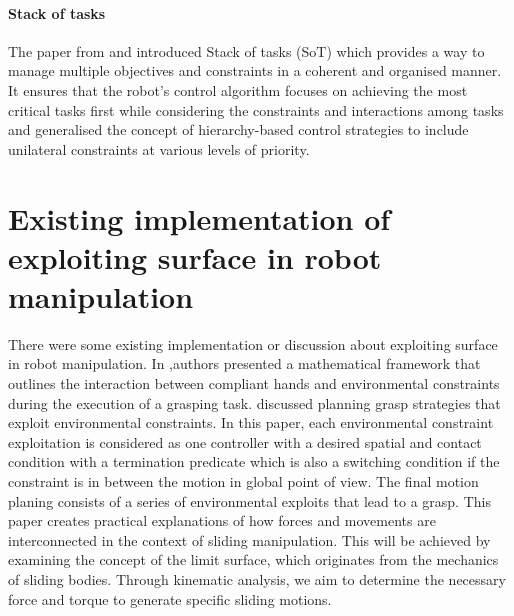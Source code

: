 \documentclass[report.tex]{subfiles}
\begin{document}
    \paragraph*{\large{Stack of tasks}\\}
    The paper from \cite{mansard2009unified} and \cite{mansard2009versatile} introduced Stack of tasks (SoT) which provides a way to manage multiple objectives and constraints in a coherent and organised manner. It ensures that the robot's control algorithm focuses on achieving the most critical tasks first while considering the constraints and interactions among tasks and generalised the concept of hierarchy-based control strategies to include unilateral constraints at various levels of priority.
    \section{Existing implementation of exploiting surface in robot manipulation}\label{Existing implementation of exploting surface in robot manipulation}
    There were some existing implementation or discussion about exploiting surface in robot manipulation. In \cite{salvietti2015modeling} ,authors presented a mathematical framework that outlines the interaction between compliant hands and environmental constraints during the execution of a grasping task. \cite{eppner2015planning} discussed planning grasp strategies that exploit environmental constraints. In this paper, each environmental constraint exploitation is considered as one controller with a desired spatial and contact condition with a termination predicate which is also a switching condition if the constraint is in between the motion in global point of view. The final motion planing consists of a series of environmental exploits that lead to a grasp. This paper \cite{howe1996practical} creates practical explanations of how forces and movements are interconnected in the context of sliding manipulation. This will be achieved by examining the concept of the limit surface, which originates from the mechanics of sliding bodies. Through kinematic analysis, we aim to determine the necessary force and torque to generate specific sliding motions.
\end{document}
